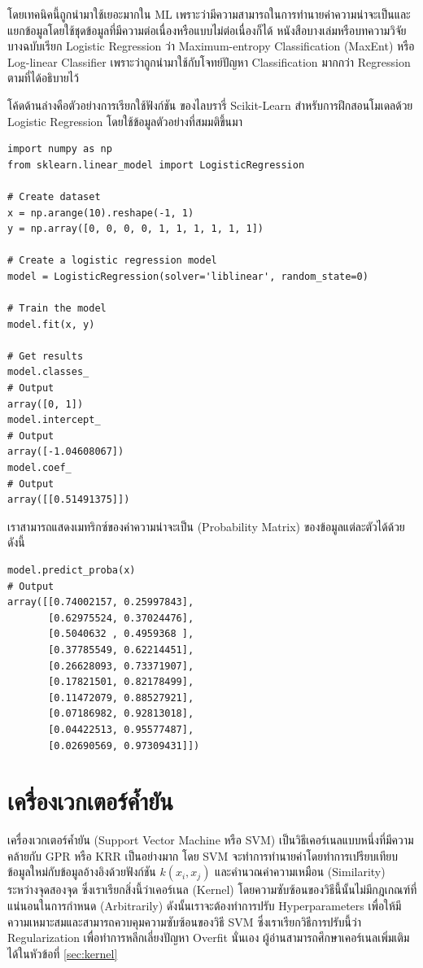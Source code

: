 โดยเทคนิคนี้ถูกนำมาใช้เยอะมากใน ML เพราะว่ามีความสามารถในการทำนายค่าความน่าจะเป็นและแยกข้อมูลโดยใช้ชุดข้อมูลที่มีความต่อเนื่องหรือแบบไม่ต่อเนื่องก็ได้ หนังสือบางเล่มหรือบทความวิจัยบางฉบับเรียก Logistic Regression ว่า Maximum-entropy Classification (MaxEnt) หรือ Log-linear Classifier เพราะว่าถูกนำมาใช้กับโจทย์ปัญหา Classification มากกว่า Regression ตามที่ได้อธิบายไว้

โค้ดด้านล่างคือตัวอย่างการเรียกใช้ฟังก์ชัน  ของไลบรารี่ Scikit-Learn สำหรับการฝึกสอนโมเดลด้วย Logistic Regression โดยใช้ข้อมูลตัวอย่างที่สมมติขึ้นมา

\begin{lstlisting}[style=MyPython]
import numpy as np
from sklearn.linear_model import LogisticRegression

# Create dataset
x = np.arange(10).reshape(-1, 1)
y = np.array([0, 0, 0, 0, 1, 1, 1, 1, 1, 1])

# Create a logistic regression model
model = LogisticRegression(solver='liblinear', random_state=0)

# Train the model
model.fit(x, y)

# Get results
model.classes_
# Output
array([0, 1])
model.intercept_
# Output
array([-1.04608067])
model.coef_
# Output
array([[0.51491375]])
\end{lstlisting}

\vspace{1em}

\noindent เราสามารถแสดงเมทริกซ์ของค่าความน่าจะเป็น (Probability Matrix) ของข้อมูลแต่ละตัวได้ด้วย ดังนี้

\begin{lstlisting}[style=MyPython]
model.predict_proba(x)
# Output
array([[0.74002157, 0.25997843],
       [0.62975524, 0.37024476],
       [0.5040632 , 0.4959368 ],
       [0.37785549, 0.62214451],
       [0.26628093, 0.73371907],
       [0.17821501, 0.82178499],
       [0.11472079, 0.88527921],
       [0.07186982, 0.92813018],
       [0.04422513, 0.95577487],
       [0.02690569, 0.97309431]])
\end{lstlisting}

\section{เครื่องเวกเตอร์ค้ำยัน}
\label{sec:svm}

เครื่องเวกเตอร์ค้ำยัน (Support Vector Machine หรือ SVM) เป็นวิธีเคอร์เนลแบบหนึ่งที่มีความคล้ายกับ GPR หรือ KRR เป็นอย่างมาก โดย SVM จะทำการทำนายค่าโดยทำการเปรียบเทียบข้อมูลใหม่กับข้อมูลอ้างอิงด้วยฟังก์ชัน $k(x_{i},x_{j})$ และคำนวณค่าความเหมือน (Similarity) ระหว่างจุดสองจุด ซึ่งเราเรียกสิ่งนี้ว่าเคอร์เนล (Kernel) โดยความซับซ้อนของวิธีนี้นั้นไม่มีกฎเกณฑ์ที่แน่นอนในการกำหนด (Arbitrarily) ดังนั้นเราจะต้องทำการปรับ Hyperparameters เพื่อให้มีความเหมาะสมและสามารถควบคุมความซับซ้อนของวิธี SVM ซึ่งเราเรียกวิธีการปรับนี้ว่า Regularization เพื่อทำการหลีกเลี่ยงปัญหา Overfit นั่นเอง ผู้อ่านสามารถศึกษาเคอร์เนลเพิ่มเติมได้ในหัวข้อที่ \ref{sec:kernel}

